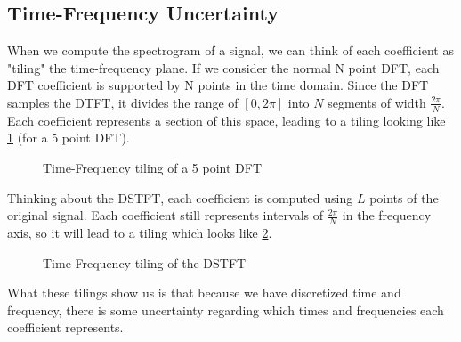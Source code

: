 \subsection{Time-Frequency Uncertainty} 
When we compute the spectrogram of a signal, we can think of each coefficient as "tiling" the time-frequency plane.
If we consider the normal N point DFT, each DFT coefficient is supported by N points in the time domain.
Since the DFT samples the DTFT, it divides the range of $[0, 2\pi]$ into $N$ segments of width $\frac{2\pi}{N}$.
Each coefficient represents a section of this space, leading to a tiling looking like \cref{fig:dft-tiling} (for a 5 point DFT).
\begin{gitbook-image}
\begin{figure}[!h]
  \centering
  \caption{Time-Frequency tiling of a 5 point DFT}
  \label{fig:dft-tiling}
\end{figure}
\end{gitbook-image}
Thinking about the DSTFT, each coefficient is computed using $L$ points of the original signal.
Each coefficient still represents intervals of $\frac{2\pi}{N}$ in the frequency axis, so it will lead to a tiling which looks like \cref{fig:dstft-tiling}.
\begin{gitbook-image}
\begin{figure}[!h]
  \centering
  \caption{Time-Frequency tiling of the DSTFT}
  \label{fig:dstft-tiling}
\end{figure}
\end{gitbook-image}
What these tilings show us is that because we have discretized time and frequency, there is some uncertainty regarding which times and frequencies each coefficient represents.

